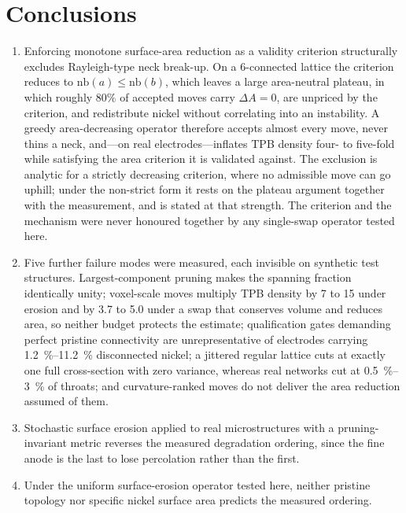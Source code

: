\documentclass[5p,times,twocolumn]{elsarticle}
\newcommand{\nb}{\mathrm{nb}}
\begin{document}
\section{Conclusions}

\begin{enumerate}
\item Enforcing monotone surface-area reduction as a validity criterion
  structurally excludes Rayleigh-type neck break-up. On a 6-connected lattice
  the criterion reduces to $\nb(a)\leq\nb(b)$, which leaves a large
  area-neutral plateau, in which roughly $80\%$ of accepted moves carry
  $\Delta A = 0$, are unpriced by the criterion, and redistribute nickel
  without correlating into an instability. A greedy area-decreasing operator
  therefore accepts almost every move, never thins a neck, and---on real
  electrodes---inflates TPB density four- to five-fold while satisfying the
  area criterion it is validated against. The exclusion is analytic for a
  strictly decreasing criterion, where no admissible move can go uphill; under
  the non-strict form it rests on the plateau argument together with the
  measurement, and is stated at that strength. The criterion and the mechanism
  were never honoured together by any single-swap operator tested here.
\item Five further failure modes were measured, each invisible on synthetic
  test structures. Largest-component pruning makes the spanning fraction
  identically unity; voxel-scale moves multiply TPB density by 7 to 15 under
  erosion and by 3.7 to 5.0 under a swap that conserves volume and reduces
  area, so neither budget protects the estimate; qualification gates demanding perfect pristine
  connectivity are unrepresentative of electrodes carrying
  \SIrange{1.2}{11.2}{\percent} disconnected nickel; a jittered regular
  lattice cuts at exactly one full cross-section with zero variance, whereas
  real networks cut at \SIrange{0.5}{3}{\percent} of throats; and
  curvature-ranked moves do not deliver the area reduction assumed of them.
\item Stochastic surface erosion applied to real microstructures with a
  pruning-invariant metric reverses the measured degradation ordering, since
the
  fine anode is the last to lose percolation rather than the first.
\item Under the uniform surface-erosion operator tested here, neither pristine
  topology nor specific nickel surface area predicts the measured ordering.

\end{enumerate}
\end{document}
